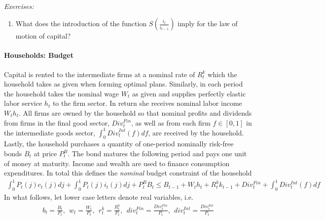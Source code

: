 ~\\\noindent\emph{Exercises:}
\begin{enumerate}[resume]
\item What does the introduction of the function $S\left(\frac{i_t}{i_{t-1}}\right)$ imply for the law of motion of capital?
\end{enumerate}

\paragraph{Households: Budget}
Capital is rented to the intermediate firms at a nominal rate of $R^k_{t}$ which the household takes as given when forming optimal plans.
Similarly, in each period the household takes the nominal wage $W_t$ as given and supplies perfectly elastic labor service $h_t$ to the firm sector.
In return she receives nominal labor income $W_t h_t$.
All firms are owned by the household so that nominal profits and dividends from firms in the final good sector, $ Div^{Fin}_t$,
  as well as from each firm $f\in[0,1]$ in the intermediate goods sector, $\int_0^1 {Div}^{Int}_t(f)df$,
  are received by the household.
Lastly, the household purchases a quantity of one-period nominally risk-free bonds $B_t$ at price $P^B_t$.
The bond matures the following period and pays one unit of money at maturity.
Income and wealth are used to finance consumption expenditures.
In total this defines the \emph{nominal} budget constraint of the household
\begin{align}
\int_0^1 P_t(j) c_t(j) dj + \int_0^1 P_t(j) i_t(j) dj + P^B_t B_t \leq B_{t-1} + W_t h_t + R^k_tk_{t-1} + Div^{Fin}_t + \int_0^1 Div^{Int}_t(f) df
\label{eq:NewKeynesian.BudgetNominal}
\end{align}
In what follows, let lower case letters denote real variables, i.e.\
\begin{align*}
b_t=\frac{B_t}{P_t},~~ w_t=\frac{W_t}{P_t},~~ r^k_t = \frac{R^k_t}{P_t},~~ div^{Fin}_t = \frac{Div^{Fin}_t}{P_t},~~ div^{Int}_t = \frac{Div^{Int}_t}{P_t}
\end{align*}

